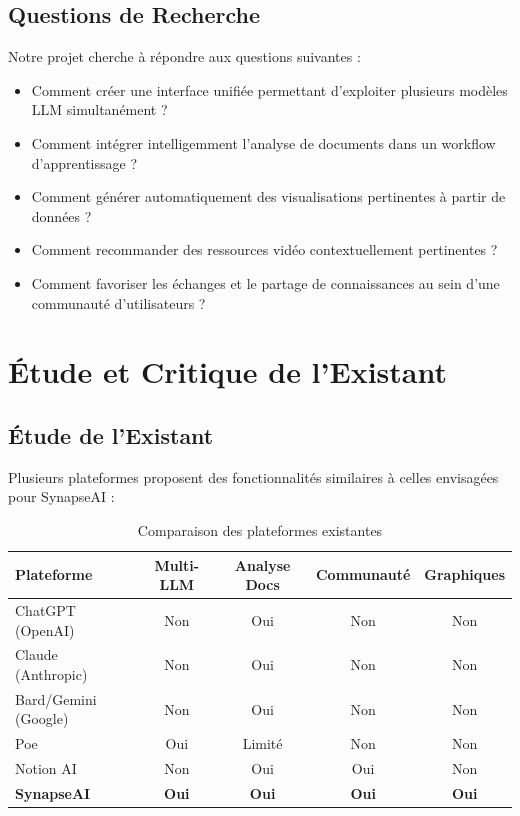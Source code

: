 \subsection{Questions de Recherche}

Notre projet cherche à répondre aux questions suivantes :

\begin{itemize}
    \item Comment créer une interface unifiée permettant d'exploiter plusieurs modèles LLM simultanément ?
    \item Comment intégrer intelligemment l'analyse de documents dans un workflow d'apprentissage ?
    \item Comment générer automatiquement des visualisations pertinentes à partir de données ?
    \item Comment recommander des ressources vidéo contextuellement pertinentes ?
    \item Comment favoriser les échanges et le partage de connaissances au sein d'une communauté d'utilisateurs ?
\end{itemize}

\section{Étude et Critique de l'Existant}

\subsection{Étude de l'Existant}

Plusieurs plateformes proposent des fonctionnalités similaires à celles envisagées pour SynapseAI :

\begin{table}[H]
\centering
\caption{Comparaison des plateformes existantes}
\label{tab:existant}
\begin{tabular}{|l|c|c|c|c|}
\hline
\textbf{Plateforme} & \textbf{Multi-LLM} & \textbf{Analyse Docs} & \textbf{Communauté} & \textbf{Graphiques} \\
\hline
ChatGPT (OpenAI) & Non & Oui & Non & Non \\
\hline
Claude (Anthropic) & Non & Oui & Non & Non \\
\hline
Bard/Gemini (Google) & Non & Oui & Non & Non \\
\hline
Poe & Oui & Limité & Non & Non \\
\hline
Notion AI & Non & Oui & Oui & Non \\
\hline
\textbf{SynapseAI} & \textbf{Oui} & \textbf{Oui} & \textbf{Oui} & \textbf{Oui} \\
\hline
\end{tabular}
\end{table}


